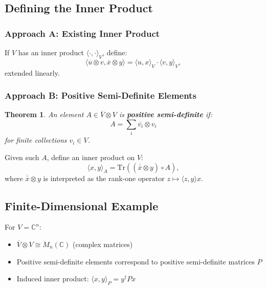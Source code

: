 \documentclass[aps,preprint]{revtex4}
\newtheorem{theorem}{Theorem}
\begin{document}
\subsection{Defining the Inner Product}

\subsubsection{Approach A: Existing Inner Product}

If $V$ has an inner product $\langle \cdot, \cdot \rangle_V$, define: 
\begin{equation}
\langle \overline{u} \otimes v, \overline{x} \otimes y \rangle = \langle u,
x \rangle_V \cdot \langle v, y \rangle_V,
\end{equation}
extended linearly.

\subsubsection{Approach B: Positive Semi-Definite Elements}

\begin{theorem}
An element $A\in \overline{V}\otimes V$ is \textbf{positive semi-definite}
if: 
\begin{equation}
A=\sum_{i}\overline{v_{i}}\otimes v_{i}
\end{equation}%
for finite collections $v_{i}\in V$.
\end{theorem}

Given such $A$, define an inner product on $V$: 
\begin{equation}
\langle x,y\rangle _{A}=\text{Tr}((\overline{\overline{x}}\otimes y)\circ A),
\end{equation}%
where $\overline{\overline{x}}\otimes y$ is interpreted as the rank-one
operator $z\mapsto \langle z,y\rangle x$.

\subsection{Finite-Dimensional Example}

For $V = \mathbb{C}^n$:

\begin{itemize}
\item $\overline{V} \otimes V \cong M_n(\mathbb{C})$ (complex matrices)

\item Positive semi-definite elements correspond to positive semi-definite
matrices $P$

\item Induced inner product: $\langle x, y \rangle_P = y^\dagger P x$
\end{itemize}
\end{document}
